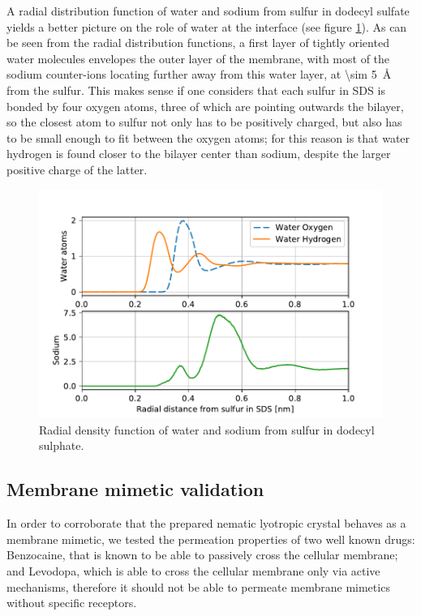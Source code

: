 \documentclass[3p,preprint,review]{elsarticle}
\begin{document}
	A radial distribution function of water and sodium from sulfur in dodecyl
	sulfate yields a better picture on the role of water at the interface (see
	figure
	\ref{fig:rdf}). As can be seen from the radial distribution functions, a first
	layer of tightly oriented water molecules envelopes the outer layer of the
	membrane, with most of the sodium counter-ions locating further away from this
	water layer, at \SI{\sim 5}{\angstrom} from the sulfur. This makes sense if one
	considers that each sulfur in SDS is bonded by four oxygen atoms, three of
	which
	are pointing outwards the bilayer, so the closest atom to sulfur not only has
	to
	be positively charged, but also has to be small enough to fit between the
	oxygen
	atoms; for this reason is that water hydrogen is found closer to the bilayer
	center
	than sodium, despite the larger positive charge of the latter.
	\begin{figure}[htb]
		\centering
		\includegraphics[width=\columnwidth]{rdf}
		\caption{Radial density function of water and sodium from sulfur in dodecyl
			sulphate.}
		\label{fig:rdf}
	\end{figure}
	
	\subsection{Membrane mimetic validation}
	\label{sec:validation}
	
	In order to corroborate that the prepared nematic lyotropic crystal behaves as
	a membrane mimetic, we tested the
	permeation properties of two well known drugs: Benzocaine, that is known to be
	able to
	passively
	cross the cellular membrane; and Levodopa, which is able to cross
	the
	cellular membrane only via active mechanisms, therefore it should not be able
	to
	permeate membrane mimetics without specific receptors.
	
\end{document}
